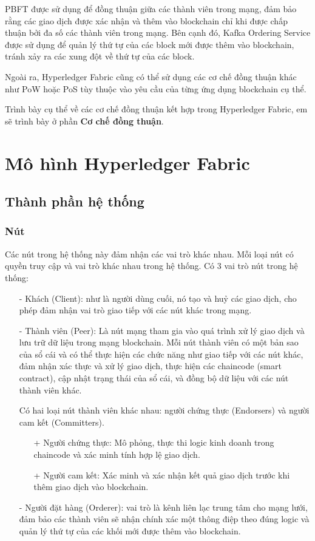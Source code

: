 PBFT được sử dụng để đồng thuận giữa các thành viên trong mạng, đảm bảo rằng các giao dịch 
được xác nhận và thêm vào blockchain chỉ khi được chấp thuận bởi đa số các thành viên trong mạng. 
Bên cạnh đó, Kafka Ordering Service được sử dụng để quản lý thứ tự của các block mới được 
thêm vào blockchain, tránh xảy ra các xung đột về thứ tự của các block. 

Ngoài ra, Hyperledger Fabric cũng có thể sử dụng các cơ chế đồng thuận khác như PoW hoặc PoS 
tùy thuộc vào yêu cầu của từng ứng dụng blockchain cụ thể. 

Trình bày cụ thể về các cơ chế đồng thuận kết hợp trong Hyperledger Fabric, em sẽ trình bày 
ở phần \textbf{Cơ chế đồng thuận}.
\section{Mô hình Hyperledger Fabric}
\subsection{Thành phần hệ thống}
\subsubsection{Nút}
Các nút trong hệ thống này đảm nhận các vai trò khác nhau. Mỗi loại nút có quyền truy cập và vai trò khác
nhau trong hệ thống.
Có 3 vai trò nút trong hệ thống:  
\begin{itemize}
    \item[-] Khách (Client): như là người dùng cuối, nó tạo và huỷ 
    các giao dịch, cho phép đảm nhận vai trò giao tiếp với các nút khác trong mạng.
    \item[-] Thành viên (Peer): Là nút mạng tham gia vào quá trình xử lý giao dịch và lưu trữ 
    dữ liệu trong mạng blockchain. Mỗi nút thành viên có một bản sao của sổ cái và có 
    thể thực hiện các chức năng như giao tiếp với các nút khác, đảm nhận xác thực và xử lý 
    giao dịch, thực hiện các chaincode (smart contract), cập nhật trạng thái của 
    sổ cái, và đồng bộ dữ liệu với các nút thành viên khác.
    
    Có hai loại nút thành viên khác nhau: người chứng thực (Endorsers) và người cam kết (Committers).
        \begin{itemize}
            \item[+] Người chứng thực: Mô phỏng, thực thi logic kinh doanh trong chaincode và xác minh tính hợp lệ giao dịch.
            \item[+] Người cam kết: Xác minh và xác nhận kết quả giao dịch trước khi thêm giao dịch vào blockchain.
        \end{itemize}
    \item[-] Người đặt hàng (Orderer): vai trò là kênh liên lạc trung tâm cho mạng lưới, 
    đảm bảo các thành viên sẽ nhận chính 
    xác một thông điệp theo đúng logic và quản lý thứ tự của các 
    khối mới được thêm vào blockchain.
    
\end{itemize}
